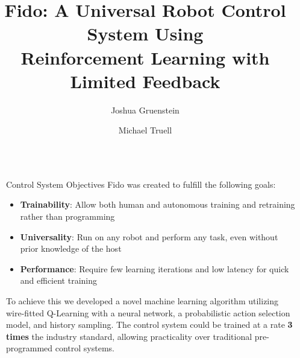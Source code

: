 \documentclass[final]{beamer}
\title{Fido: A Universal Robot Control System Using\\Reinforcement Learning with Limited Feedback}
\author{\LARGE Joshua Gruenstein \and Michael Truell}
\institute{\mbox{}}
\newlength{\sepwid}
\newlength{\onecolwid}
\begin{document}
\setlength{\belowcaptionskip}{2ex}
\setlength\belowdisplayshortskip{2ex}

\begin{frame}[t]
\begin{columns}[t]

\begin{column}{\sepwid}\end{column}
\begin{column}{\onecolwid}

	\begin{alertblock}{Control System Objectives}
		Fido was created to fulfill the following goals:
		\begin{itemize}
			\item \textbf{Trainability}: Allow both human and autonomous training and retraining rather than programming
			\item \textbf{Universality}: Run on any robot and perform any task, even without prior knowledge of the host
			\item \textbf{Performance}: Require few learning iterations and low latency for quick and efficient training
		\end{itemize}
		To achieve this we developed a novel machine learning algorithm utilizing wire-fitted Q-Learning with a neural network, a probabilistic action selection model, and history sampling.  The control system could be trained at a rate \textbf{3 times} the industry standard, allowing practicality over traditional pre-programmed control systems.
	\end{alertblock}


\end{column}
\end{columns}
\end{frame}
\end{document}
